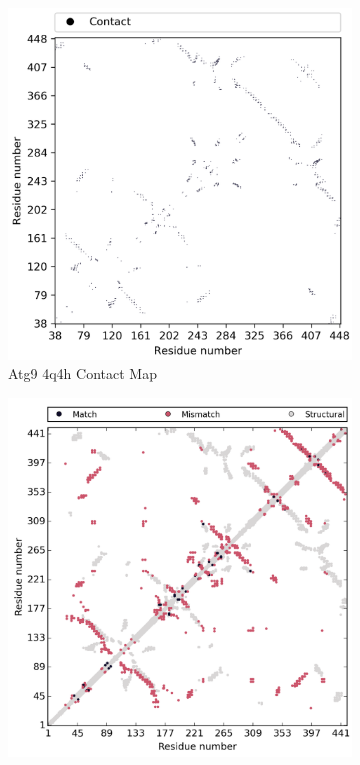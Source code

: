 \begin{figure}[htb]
    \centering %
\begin{subfigure}{0.5\textwidth}
  \includegraphics[width=\linewidth]{Modelling of Atg9/atg9_hmo_4q4h_cmap.png}
  \caption{Atg9 4q4h Contact Map}
  \label{fig:0}
\end{subfigure}\hfil %
\begin{subfigure}{0.45\textwidth}
  \includegraphics[width=\linewidth]{Modelling of Atg9/super_atg9_hmo_4q4h.png}

\end{subfigure}
\end{figure}
